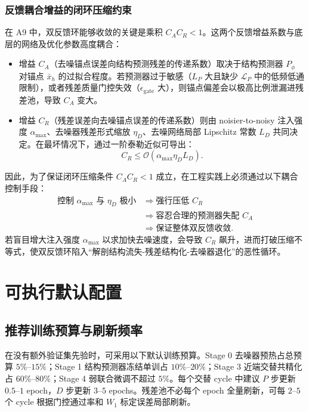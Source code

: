 \documentclass[11pt,a4paper,UTF8,fontset=fandol]{ctexart}
\theoremstyle{definition}
\newcommand{\cL}{\mathcal{L}}
\begin{document}
\subsubsection{反馈耦合增益的闭环压缩约束}
在 A9 中，双反馈环能够收敛的关键是乘积 $C_A C_R < 1$。这两个反馈增益系数与底层的网络及优化参数高度耦合：
\begin{itemize}[leftmargin=2em]
    \item 增益 $C_A$（去噪锚点误差向结构预测残差的传递系数）取决于结构预测器 $P_\phi$ 对锚点 $\bar x_h$ 的过拟合程度。若预测器过于敏感（$L_P$ 大且缺少 $\cL_P$ 中的低频低通限制），或者残差质量门控失效（$\epsilon_{\mathrm{gate}}$ 大），则锚点偏差会以极高比例泄漏进残差池，导致 $C_A$ 变大。
    \item 增益 $C_R$（残差误差向去噪锚点误差的传递系数）则由 noisier-to-noisy 注入强度 $\alpha_{\max}$、去噪器残差形式缩放 $\eta_D$、去噪网络局部 Lipschitz 常数 $L_D$ 共同决定。在最坏情况下，通过一阶泰勒近似可导出：
    \begin{equation}
        C_R \le \mathcal{O}(\alpha_{\max} \eta_D L_D).
    \end{equation}
\end{itemize}
因此，为了保证闭环压缩条件 $C_AC_R < 1$ 成立，在工程实践上必须通过以下耦合控制手段：
\begin{equation}
\begin{aligned}
    \text{控制 } \alpha_{\max} \text{ 与 } \eta_D \text{ 极小} 
    &\Longrightarrow \text{强行压低 } C_R \\
    &\Longrightarrow \text{容忍合理的预测器失配 } C_A \\
    &\Longrightarrow \text{保证整体双反馈收敛}.
\end{aligned}
\end{equation}
若盲目增大注入强度 $\alpha_{\max}$ 以求加快去噪速度，会导致 $C_R$ 飙升，进而打破压缩不等式，使双反馈环陷入“解剖结构流失-残差结构化-去噪器退化”的恶性循环。

\section{可执行默认配置}

\subsection{推荐训练预算与刷新频率}

在没有额外验证集先验时，可采用以下默认训练预算。Stage 0 去噪器预热占总预算 $5\%$--$15\%$；Stage 1 结构预测器冻结单训占 $10\%$--$20\%$；Stage 3 近端交替共精化占 $60\%$--$80\%$；Stage 4 弱联合微调不超过 $5\%$。每个交替 cycle 中建议 $P$ 步更新 $0.5$--$1$ epoch，$D$ 步更新 $3$--$5$ epochs。残差池不必每个 epoch 全量刷新，可每 $2$--$5$ 个 cycle 根据门控通过率和 $W_1$ 标定误差局部刷新。
\end{document}
